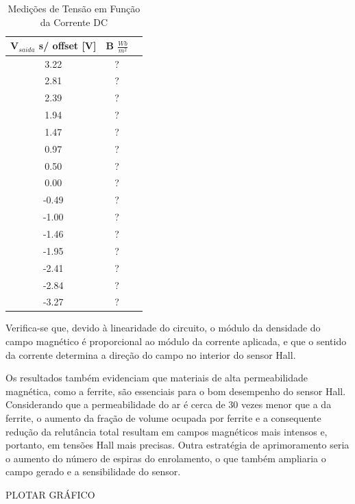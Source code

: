 \documentclass[10pt,twocolumn,letterpaper]{article}
\begin{document}
\begin{table}[htbp]
    \centering
    \caption{Medições de Tensão em Função da Corrente DC}
    \label{tab:medicoes_tensao}
    \vspace{0.25cm}
    \begin{tabular}{ccc}
        \hline
        \rule{0pt}{3ex}\textbf{\textbf{V}}$_{saida}$ \textbf{s/ offset [V]} & \textbf{B} $\frac{Wb}{m^2}$ \\[5pt]
        \hline
        \rule{0pt}{3ex}3.22 & ? \\
        2.81 &  ? \\
        2.39 &  ? \\
        1.94 &  ? \\
        1.47 &  ? \\
        0.97 &  ? \\
        0.50 &  ? \\
        0.00 &  ? \\
        -0.49 &  ? \\
        -1.00 &  ? \\
        -1.46 &  ? \\
        -1.95 &  ? \\
        -2.41 &  ? \\
        -2.84 &  ? \\
        -3.27 &  ? \\[5pt]
        \hline
    \end{tabular}
\end{table}

\hspace{1cm} Verifica-se que, devido à linearidade do circuito, o módulo da densidade do campo magnético é proporcional ao módulo da corrente aplicada, e que o sentido da corrente determina a direção do campo no interior do sensor Hall.

\hspace{1cm} Os resultados também evidenciam que materiais de alta permeabilidade magnética, como a ferrite, são essenciais para o bom desempenho do sensor Hall. Considerando que a permeabilidade do ar é cerca de 30 vezes menor que a da ferrite, o aumento da fração de volume ocupada por ferrite e a consequente redução da relutância total resultam em campos magnéticos mais intensos e, portanto, em tensões Hall mais precisas. Outra estratégia de aprimoramento seria o aumento do número de espiras do enrolamento, o que também ampliaria o campo gerado e a sensibilidade do sensor.

{\Huge PLOTAR GRÁFICO}
\end{document}

